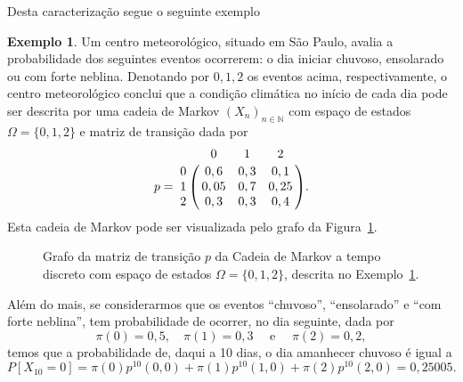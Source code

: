 \documentclass[twoside,openright,titlepage,numbers=noenddot,headinclude,  lineheaders footinclude=true,cleardoublepage=empty,
                                BCOR=5mm,paper=a4,fontsize=12pt ]{scrbook}
\theoremstyle{definition}
\newtheorem{exmp}{Exemplo}[section]
\begin{document}
Desta caracterização segue o seguinte exemplo
\begin{exmp}\label{exmp:graph}
Um centro meteorológico, situado em São Paulo, avalia 
a probabilidade dos seguintes eventos ocorrerem: o dia 
iniciar chuvoso, ensolarado ou com forte neblina. Denotando por
$0,1,2$ os eventos acima, respectivamente, o centro meteorológico
conclui que a condição climática no início de cada dia pode ser
descrita por uma cadeia de Markov $(X_n)_{n \in \mathbb{N}}$ com
espaço de estados $\Omega = \{0,1,2\}$ 
e matriz de transição dada por
\[
p= 
\bordermatrix{~ & 0 & 1 & 2 \cr
   0 &0,6 &  0,3 & 0,1 \cr 
   1 &0,05 &  0,7 & 0,25 \cr
   2 &0,3 &  0,3 & 0,4\cr}.
\]
Esta cadeia de Markov pode ser visualizada pelo  grafo da Figura~\ref{fig:graph}.
\begin{figure}[h]
\centering
{}
\caption{Grafo da matriz de transição $p$ da Cadeia de Markov a tempo discreto
com espaço de estados $\Omega = \{0, 1, 2\}$, descrita
no Exemplo~\ref{exmp:graph}.}
\label{fig:graph}
\end{figure}
Além do mais, se considerarmos que os eventos ``chuvoso'', ``ensolarado'' e ``com forte neblina'', 
tem probabilidade de ocorrer, no dia seguinte, dada por
\[\pi(0) = 0,5, \quad \pi(1) = 0,3 \quad \text{ e } \quad  \pi(2) = 0,2,\]
temos que a probabilidade de, daqui a 10 dias, o dia amanhecer chuvoso é igual a 
\[
P[X_{10} = 0] = \pi(0) p^{10}(0,0) + \pi(1) p^{10}(1,0) + \pi(2) p^{10}(2,0) = 0,25005.
\]
\end{exmp}
\end{document}
